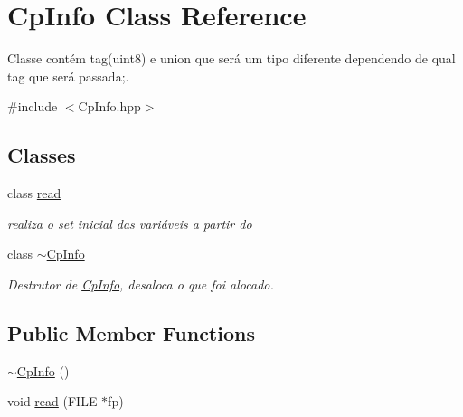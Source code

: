 \hypertarget{class_cp_info}{}\section{Cp\+Info Class Reference}
\label{class_cp_info}


Classe contém tag(uint8) e union que será um tipo diferente dependendo de qual tag que será passada;.  




{\ttfamily \#include $<$Cp\+Info.\+hpp$>$}

\subsection*{Classes}
\begin{DoxyCompactItemize}
\item 
class \hyperlink{class_cp_info_1_1read}{read}
\begin{DoxyCompactList}\small\item\em realiza o set inicial das variáveis a partir do \end{DoxyCompactList}\item 
class \hyperlink{class_cp_info_1_1~_cp_info}{$\sim$\+Cp\+Info}
\begin{DoxyCompactList}\small\item\em Destrutor de \hyperlink{class_cp_info}{Cp\+Info}, desaloca o que foi alocado. \end{DoxyCompactList}\end{DoxyCompactItemize}
\subsection*{Public Member Functions}
\begin{DoxyCompactItemize}
\item 
\hyperlink{class_cp_info_a67ca1fe35f94943081010ec05cb7d464}{$\sim$\+Cp\+Info} ()
\item 
void \hyperlink{class_cp_info_ab8c89df973cc40b407e0cdd4911923f1}{read} (F\+I\+LE $\ast$fp)
\end{DoxyCompactItemize}
